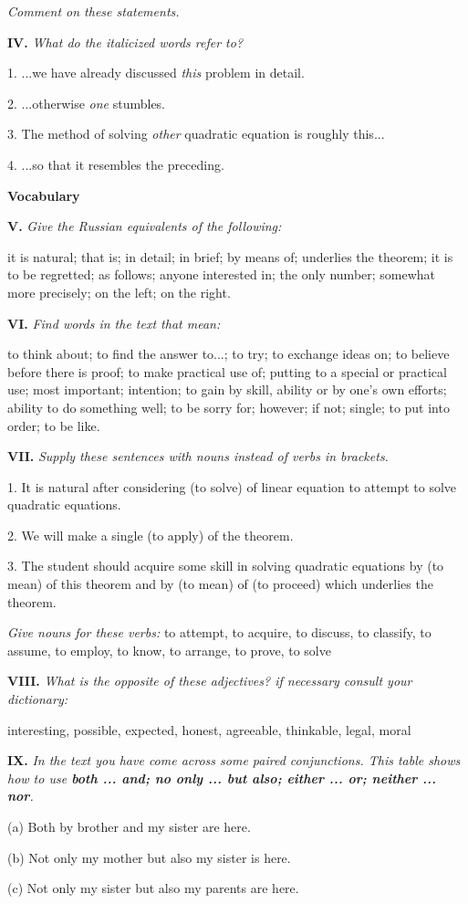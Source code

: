 \documentclass[a4paper]{article}
\newcommand{\ESect}[1]{\medskip\par{\large \textbf{#1}}\par}
\newcommand{\ETask}[2]{\medskip\par\textbf{#1.} \textit{#2}\par}
\begin{document}
\textit{Comment on these statements.}

\ETask{IV}{What do the italicized words refer to?}
1. ...we have already discussed \textit{this} problem in detail.

2. ...otherwise \textit{one} stumbles.

3. The method of solving \textit{other} quadratic equation is roughly this...

4. ...so that it resembles the preceding.

\ESect{Vocabulary}

\ETask{V}{Give the Russian equivalents of the following:}
it is natural; that is; in detail; in brief; by means of; underlies the theorem; it is to be regretted; as follows;
anyone interested in; the only number; somewhat more precisely; on the left; on the right.

\ETask{VI}{Find words in the text that mean:}
to think about; to find the answer to...; to try; to exchange ideas on; to believe before there is proof; to make
practical use of; putting to a special or practical use; most important; intention; to gain by skill, ability or by one's
own efforts; ability to do something well; to be sorry for; however; if not; single; to put into order; to be like.

\ETask{VII}{Supply these sentences with nouns instead of verbs in brackets.}
1. It is natural after considering (to solve) of linear equation to attempt to solve quadratic equations.

2. We will make a single (to apply) of the theorem.

3. The student should acquire some skill in solving quadratic equations by (to mean) of this theorem and by (to mean)
of (to proceed) which underlies the theorem.

\textit{Give nouns for these verbs:}
to attempt, to acquire, to discuss, to classify, to assume, to employ, to know, to arrange, to prove, to solve

\ETask{VIII}{What is the opposite of these adjectives? if necessary consult your dictionary:}
interesting, possible, expected, honest, agreeable, thinkable, legal, moral

\ETask{IX}{In the text you have come across some paired conjunctions. This table shows how to use \textbf{both ... and; no only ...
but also; either ... or; neither ... nor}.}
(a) Both by brother and my sister are here.

(b) Not only my mother but also my sister is here.

(c) Not only my sister but also my parents are here.
\end{document}
